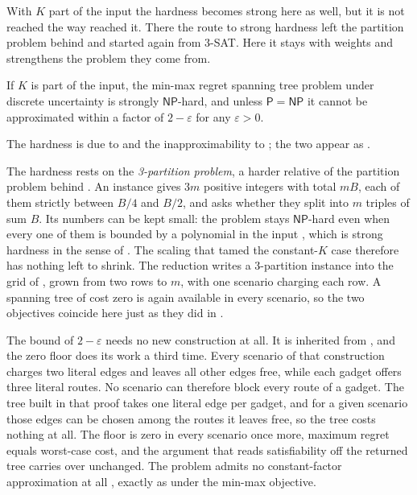 With $K$ part of the input the hardness becomes strong here as well, but it is not reached the way  reached it.
There the route to strong hardness left the partition problem behind and started again from 3-SAT.
Here it stays with weights and strengthens the problem they come from.

\begin{theorem}\label{thm:regret-kunbdd-hard}
If $K$ is part of the input, the min-max regret spanning tree problem under discrete uncertainty is strongly $\mathsf{NP}$-hard, and unless $\mathsf{P} = \mathsf{NP}$ it cannot be approximated within a factor of $2 - \varepsilon$ for any $\varepsilon > 0$.
\end{theorem}

The hardness is due to \textcite{KouvelisYu1997} and the inapproximability to \textcite{KasperskiZielinski2009}; the two appear as \cite[Theorems~8.8 and~8.9]{Goerigk2021RCO}.

The hardness rests on the \emph{\textcolor{RWTHBlue}{3-partition problem}}, a harder relative of the partition problem behind .
An instance gives $3m$ positive integers with total $mB$, each of them strictly between $B/4$ and $B/2$, and asks whether they split into $m$ triples of sum $B$.
Its numbers can be kept small: the problem stays $\mathsf{NP}$-hard even when every one of them is bounded by a polynomial in the input \cite[Section~4.2.2]{GareyJohnson1979}, which is strong hardness in the sense of .
The scaling that tamed the constant-$K$ case therefore has nothing left to shrink.
The reduction writes a 3-partition instance into the grid of , grown from two rows to $m$, with one scenario charging each row.
A spanning tree of cost zero is again available in every scenario, so the two objectives coincide here just as they did in .

The bound of $2 - \varepsilon$ needs no new construction at all.
It is inherited from , and the zero floor does its work a third time.
Every scenario of that construction charges two literal edges and leaves all other edges free, while each gadget offers three literal routes.
No scenario can therefore block every route of a gadget.
The tree built in that proof takes one literal edge per gadget, and for a given scenario those edges can be chosen among the routes it leaves free, so the tree costs nothing at all.
The floor is zero in every scenario once more, maximum regret equals worst-case cost, and the argument that reads satisfiability off the returned tree carries over unchanged.
The problem admits no constant-factor approximation at all \cite{KasperskiZielinski2011}, exactly as under the min-max objective.

